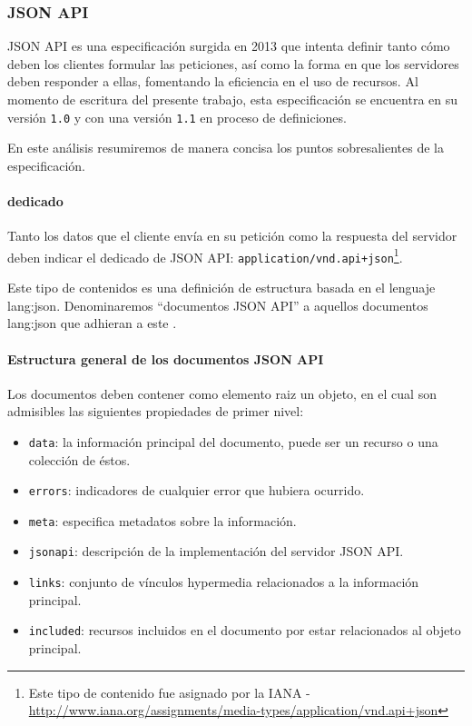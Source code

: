 \subsubsection{JSON API}
\label{soa:tecnologias:json-api}

JSON API es una especificación surgida en 2013 que intenta definir tanto cómo deben los clientes formular las peticiones, así como la forma en que los servidores deben responder a ellas, fomentando la eficiencia en el uso de recursos. Al momento de escritura del presente trabajo, esta especificación se encuentra en su versión \texttt{1.0} y con una versión \texttt{1.1} en proceso de definiciones.

En este análisis resumiremos de manera concisa los puntos sobresalientes de la especificación.

\paragraph{ dedicado}

Tanto los datos que el cliente envía en su petición como la respuesta del servidor deben indicar el  dedicado de JSON API: \texttt{application/vnd.api+json}\footnote{Este tipo de contenido fue asignado por la IANA - \url{http://www.iana.org/assignments/media-types/application/vnd.api+json}}.

Este tipo de contenidos es una definición de estructura basada en el lenguaje \gls{lang:json}. Denominaremos ``documentos JSON API'' a aquellos documentos \gls{lang:json} que adhieran a este .

\paragraph{Estructura general de los documentos JSON API}

Los documentos deben contener como elemento raiz un objeto, en el cual son admisibles las siguientes propiedades de primer nivel:

\begin{itemize}
  \item \texttt{data}: la información principal del documento, puede ser un recurso o una colección de éstos.
  \item \texttt{errors}: indicadores de cualquier error que hubiera ocurrido.
  \item \texttt{meta}: especifica metadatos sobre la información.
  \item \texttt{jsonapi}: descripción de la implementación del servidor JSON API.
  \item \texttt{links}: conjunto de vínculos hypermedia relacionados a la información principal.
  \item \texttt{included}: recursos incluidos en el documento por estar relacionados al objeto principal.
\end{itemize}

